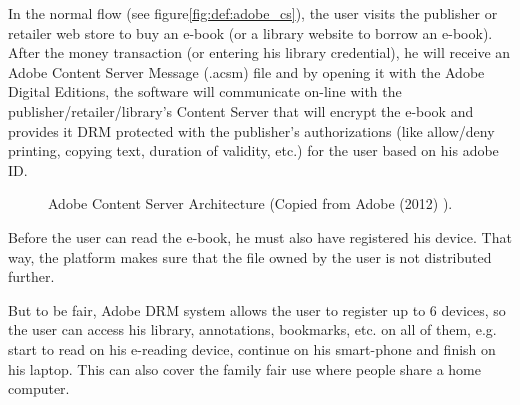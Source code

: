 \documentclass[11pt,a4paper,oneside]{memoir}
\begin{document}
In the normal flow (see figure\vref{fig:def:adobe_cs}), the user visits the publisher or retailer web store to buy an e-book (or a library website to borrow an e-book). After the money transaction (or entering his library credential), he will receive an Adobe Content Server Message (.acsm) file and by opening it with the Adobe Digital Editions, the software will communicate on-line with the publisher/retailer/library's Content Server that will encrypt the e-book and provides it DRM protected with the publisher's authorizations (like allow/deny printing, copying text, duration of validity, etc.) for the user based on his adobe ID.
\begin{figure}[h]
   \setlength{\fboxsep}{3pt}
   \caption{Adobe Content Server Architecture (Copied from Adobe (2012) \cite{adobe:content_server_architecture}).}
   \label{fig:def:adobe_cs}
\end{figure}
Before the user can read the e-book, he must also have registered his device. That way, the platform makes sure that the file owned by the user is not distributed further. 

But to be fair, Adobe DRM system allows the user to register up to 6 devices\label{def:adobe_limit}, so the user can access his library, annotations, bookmarks, etc. on all of them, e.g. start to read on his e-reading device, continue on his smart-phone and finish on his laptop. This can also cover the family fair use where people share a home computer.
\end{document}
